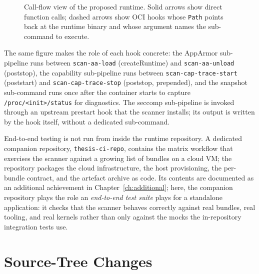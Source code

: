 \begin{figure}[H]
\caption{Call-flow view of the proposed runtime. Solid arrows show direct function calls; dashed arrows show OCI hooks whose \texttt{Path} points back at the runtime binary and whose argument names the sub-command to execute.}
\label{fig:callflow}
\end{figure}

The same figure makes the role of each hook concrete: the AppArmor sub-pipeline runs between \texttt{scan-aa-load} (createRuntime) and \texttt{scan-aa-unload} (poststop), the capability sub-pipeline runs between \texttt{scan-cap-trace-start} (poststart) and \texttt{scan-cap-trace-stop} (poststop, prepended), and the snapshot sub-command runs once after the container starts to capture \texttt{/proc/<init>/status} for diagnostics. The seccomp sub-pipeline is invoked through an upstream prestart hook that the scanner installs; its output is written by the hook itself, without a dedicated sub-command.

End-to-end testing is not run from inside the runtime repository. A dedicated companion repository, \texttt{thesis-ci-repo}, contains the matrix workflow that exercises the scanner against a growing list of bundles on a cloud VM; the repository packages the cloud infrastructure, the host provisioning, the per-bundle contract, and the artefact archive as code. Its contents are documented as an additional achievement in Chapter~\ref{ch:additional}; here, the companion repository plays the role an \emph{end-to-end test suite} plays for a standalone application: it checks that the scanner behaves correctly against real bundles, real tooling, and real kernels rather than only against the mocks the in-repository integration tests use.

\section{Source-Tree Changes}\label{sec:impl-tree}

